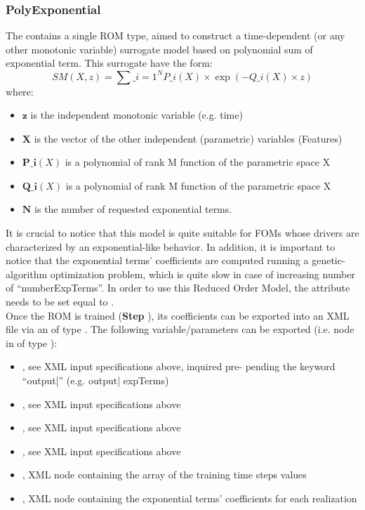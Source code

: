 \subsubsection{PolyExponential}
  The  contains a single ROM type, aimed to construct a     time-dependent
  (or any other monotonic variable) surrogate model based on polynomial sum of exponential term.
  This surrogate have the form:     \begin{equation}       SM(X,z) = \sum\_{i=1}^{N} P\_{i}(X) \times
  \exp ( - Q\_{i}(X) \times z )     \end{equation}     where:     \begin{itemize}       \item
  $\mathbf{z}$ is the independent  monotonic variable (e.g. time)       \item $\mathbf{X}$  is the
  vector of the other independent (parametric) variables  (Features)       \item $\mathbf{P\_{i}}(X)$
  is a polynomial of rank M function of the parametric space X       \item  $\mathbf{Q\_{i}}(X)$ is a
  polynomial of rank M function of the parametric space X       \item  $\mathbf{N}$ is the number of
  requested exponential terms.     \end{itemize}     It is crucial to notice that this model is
  quite suitable for FOMs whose drivers are characterized by an exponential-like behavior.     In
  addition, it is important to notice that the exponential terms' coefficients are computed running
  a genetic-algorithm optimization     problem, which is quite slow in case of increasing number of
  ``numberExpTerms''.     In order to use this Reduced Order Model, the  attribute
   needs to be set equal to .     \\     Once the ROM is
  trained (\textbf{Step} ), its coefficients can be exported into an XML file
  via an  of type . The following variable/parameters can be
  exported (i.e.  node     in  of type ):
  \begin{itemize}       \item {}, see XML input specifications above, inquired pre-
  pending the keyword ``output|'' (e.g. output| expTerms)       \item {}, see
  XML input specifications above       \item {}, see XML input specifications above
  \item {}, see XML input specifications above       \item {}, XML
  node containing the array of the training time steps values       \item {},
  XML node containing the exponential terms' coefficients for each realization     \end{itemize}

